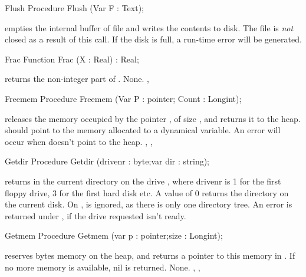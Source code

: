 \documentclass{report}
\begin{document}
\html{}
\begin{procedure}{Flush}
\Declaration
Procedure Flush (Var F : Text);

\Description
{} empties the internal buffer of file  and writes the
contents to disk. The file is \textit{not} closed as a result of this call.
\Errors
If the disk is full, a run-time error will be generated.
\SeeAlso
{}
\end{procedure}
\html{}
\begin{function}{Frac}
\Declaration
Function Frac (X : Real) : Real;

\Description
{} returns the non-integer part of .
\Errors
None.
\SeeAlso
{}, 
\end{function}
\html{}
\begin{procedure}{Freemem}
\Declaration
Procedure Freemem (Var P : pointer; Count : Longint);

\Description
{} releases the memory occupied by the pointer , of size
, and returns it to the heap.  should point to the memory
allocated to a dynamical variable.
\Errors
An error will occur when  doesn't point to the heap.
\SeeAlso
{}, , 
\end{procedure}
\html{}
\begin{procedure}{Getdir}
\Declaration
Procedure Getdir (drivenr : byte;var dir : string);

\Description
{} returns in  the current directory on the drive
, where {drivenr} is 1 for the first floppy drive, 3 for the
first hard disk etc. A value of 0 returns the directory on the current disk.
On \linux,  is ignored, as there is only one directory tree.
\Errors
An error is returned under \dos, if the drive requested isn't ready.
\SeeAlso
{}
\end{procedure}
\html{}
\begin{procedure}{Getmem}
\Declaration
Procedure Getmem (var p : pointer;size : Longint);

\Description
{} reserves  bytes memory on the heap, and returns a
pointer to this memory in . If no more memory is available, nil is
returned.
\Errors
None.
\SeeAlso
{}, , 
\end{procedure}
\end{document}
